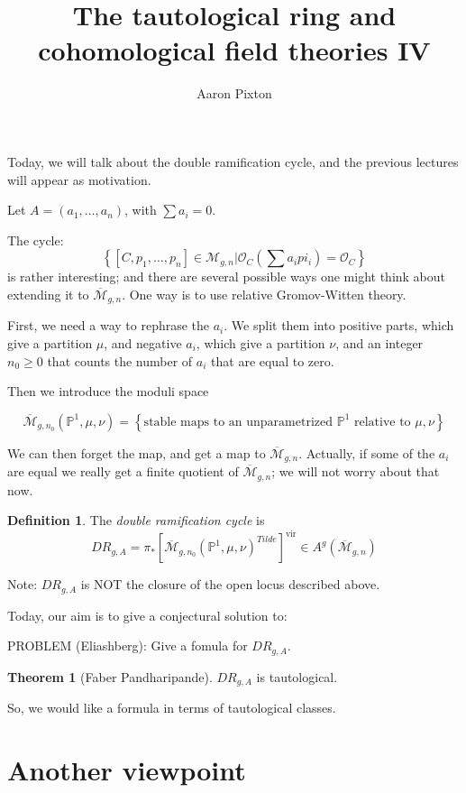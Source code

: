 \documentclass{amsart}
\title{The tautological ring and cohomological field theories IV}
\author{Aaron Pixton}
\theoremstyle{definition}
\newtheorem{theorem}{Theorem}
\newtheorem{definition}{Definition}
\newcommand{\OO}{\mathcal{O}}
\newcommand{\proj}{\mathbb{P}}
\newcommand{\Mbar}{\overline{\mathcal{M}}}
\newcommand{\M}{\mathcal{M}}
\begin{document}
\maketitle

Today, we will talk about the double ramification cycle, and the previous lectures will appear as motivation.

Let $A=(a_1,\dots,a_n)$, with $\sum a_i=0$.

The cycle:
$$\left\{[C, p_1,\dots,p_n]\in\M_{g,n}|\OO_C(\sum a_ipi_i)=\OO_C\right\}$$
is rather interesting; and there are several possible ways one might think about extending it to $\Mbar_{g,n}$.  One way is to use relative Gromov-Witten theory.

First, we need a way to rephrase the $a_i$.  We split them into positive parts, which give a partition $\mu$, and negative $a_i$, which give a partition $\nu$, and an integer $n_0\geq 0$ that counts the number of $a_i$ that are equal to zero.

Then we introduce the moduli space

$$\Mbar_{g,n_0}(\proj^1,\mu,\nu)=\left\{\text{stable maps to an unparametrized $\proj^1$ relative to $\mu,\nu$}\right\}$$

We can then forget the map, and get a map to $\Mbar_{g,n}$.  Actually, if some of the $a_i$ are equal we really get a finite quotient of $\Mbar_{g,n}$; we will not worry about that now.

\begin{definition}
The \emph{double ramification cycle} is
$$DR_{g,A}=\pi_*[\Mbar_{g,n_0}(\proj^1,\mu,\nu)^{Tilde}]^{\text{vir}}\in A^g(\Mbar_{g,n})$$
\end{definition}

Note: $DR_{g,A}$ is NOT the closure of the open locus described above.

Today, our aim is to give a conjectural solution to:

PROBLEM (Eliashberg): Give a fomula for $DR_{g,A}$.

\begin{theorem}[Faber Pandharipande]
$DR_{g,A}$ is tautological.
\end{theorem}

So, we would like a formula in terms of tautological classes.
 
\section{Another viewpoint}
\end{document}
